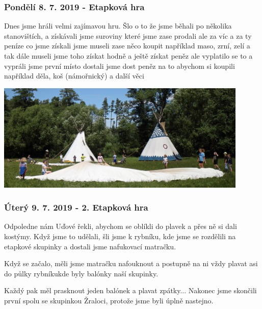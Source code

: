 \subsubsection{Pondělí 8. 7. 2019 - Etapková hra} %
\label{ssub:pondělí_8_7_2019_etapková_hra}


Dnes jsme hráli velmi zajímavou hru. Šlo o to že jsme běhali po několika stanovištích, a získávali jsme suroviny které jsme zase prodali ale za víc a za ty peníze co jsme získali jsme museli zase něco koupit například maso, zrní, zelí a tak dále museli jsme toho získat hodně a ještě získat peněz ale vyplatilo se to a vypráli jsme první místo dostali jsme dost peněz na to abychom si koupili například děla, koš (námořnický) a další věci


\begin{center}
	\includegraphics[width=12cm]{img/anpetu_tabor/typka.JPG}
\end{center}


\subsubsection{Úterý 9. 7. 2019 - 2. Etapková hra } %
\label{ssub:_9_7_2019_2_etapková_hra_}


Odpoledne nám Uďové řekli, abychom se oblíkli do plavek a přes ně si dali kostýmy. Když jsme to udělali, šli jsme k rybníku, kde jsme se rozdělili na etapkové skupinky a dostali jsme nafukovací matračku.

Když se začalo, měli jsme matračku nafouknout a postupně na ni vždy plavat asi do půlky rybníkukde byly balónky naší skupinky.

Každý pak měl prasknout jeden balónek a plavat zpátky...
Nakonec jsme skončili první spolu se skupinkou Žraloci, protože jsme byli úplně nastejno.




